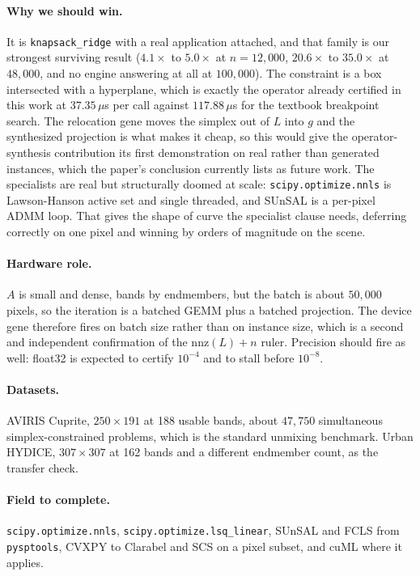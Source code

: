 \documentclass[11pt]{article}
\begin{document}
\paragraph{Why we should win.} It is \texttt{knapsack\_ridge} with a real
application attached, and that family is our strongest surviving result
($4.1\times$ to $5.0\times$ at $n = 12{,}000$, $20.6\times$ to $35.0\times$ at
$48{,}000$, and no engine answering at all at $100{,}000$). The constraint is a
box intersected with a hyperplane, which is exactly the operator already
certified in this work at $37.35\,\mu$s per call against $117.88\,\mu$s for the
textbook breakpoint search. The relocation gene moves the simplex out of $L$
into $g$ and the synthesized projection is what makes it cheap, so this would
give the operator-synthesis contribution its first demonstration on real rather
than generated instances, which the paper's conclusion currently lists as
future work. The specialists are real but structurally doomed at scale:
\texttt{scipy.optimize.nnls} is Lawson-Hanson active set and single threaded,
and SUnSAL is a per-pixel ADMM loop. That gives the shape of curve the
specialist clause needs, deferring correctly on one pixel and winning by orders
of magnitude on the scene.

\paragraph{Hardware role.} $A$ is small and dense, bands by endmembers, but the
batch is about $50{,}000$ pixels, so the iteration is a batched GEMM plus a
batched projection. The device gene therefore fires on batch size rather than on
instance size, which is a second and independent confirmation of the
$\mathrm{nnz}(L) + n$ ruler. Precision should fire as well: float32 is expected
to certify $10^{-4}$ and to stall before $10^{-8}$.

\paragraph{Datasets.} AVIRIS Cuprite, $250 \times 191$ at 188 usable bands,
about $47{,}750$ simultaneous simplex-constrained problems, which is the
standard unmixing benchmark. Urban HYDICE, $307 \times 307$ at 162 bands and a
different endmember count, as the transfer check.

\paragraph{Field to complete.} \texttt{scipy.optimize.nnls},
\texttt{scipy.optimize.lsq\_linear}, SUnSAL and FCLS from \texttt{pysptools},
CVXPY to Clarabel and SCS on a pixel subset, and cuML where it applies.
\end{document}
